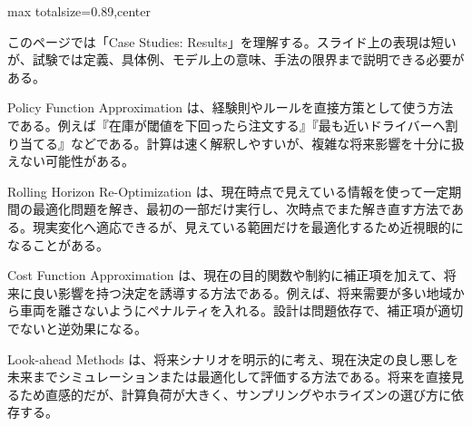 \begin{minipage}[t]{0.58\textwidth}
\begin{adjustbox}{max totalsize={\textwidth}{0.89\textheight},center}
\begin{minipage}{\textwidth}\scriptsize
{}このページでは「Case Studies: Results」を理解する。スライド上の表現は短いが、試験では定義、具体例、モデル上の意味、手法の限界まで説明できる必要がある。\par
Policy Function Approximation は、経験則やルールを直接方策として使う方法である。例えば『在庫が閾値を下回ったら注文する』『最も近いドライバーへ割り当てる』などである。計算は速く解釈しやすいが、複雑な将来影響を十分に扱えない可能性がある。\par
Rolling Horizon Re-Optimization は、現在時点で見えている情報を使って一定期間の最適化問題を解き、最初の一部だけ実行し、次時点でまた解き直す方法である。現実変化へ適応できるが、見えている範囲だけを最適化するため近視眼的になることがある。\par
Cost Function Approximation は、現在の目的関数や制約に補正項を加えて、将来に良い影響を持つ決定を誘導する方法である。例えば、将来需要が多い地域から車両を離さないようにペナルティを入れる。設計は問題依存で、補正項が適切でないと逆効果になる。\par
Look-ahead Methods は、将来シナリオを明示的に考え、現在決定の良し悪しを未来までシミュレーションまたは最適化して評価する方法である。将来を直接見るため直感的だが、計算負荷が大きく、サンプリングやホライズンの選び方に依存する。\par

\end{minipage}
\end{adjustbox}
\end{minipage}
